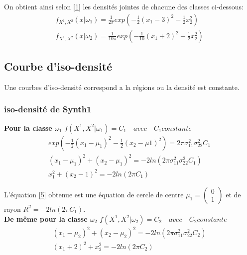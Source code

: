 \documentclass[10pt]{article}
\begin{document}
On obtient ainsi selon \eqref{1} les densités jointes de chacune des classes ci-dessous:
\begin{equation}
\begin{split}
f_{X^{1}, X^{2}}(x|\omega_{1}) = \frac{1}{2\pi} exp(-\frac{1}{2}(x_{1}-3)^2 - \frac{1}{2}x_{2}^2       )  \\
f_{X^{1}, X^{2}}(x|\omega_{2}) = \frac{1}{10\pi} exp(-\frac{1}{10}(x_{1}+2)^{2}  - \frac{1}{2}x_{2}^{2})
\end{split}
\label{6}
\end{equation}


\subsection{Courbe d'iso-densité}
Une courbes d'iso-densité correspond a la régions ou la densité est constante.

\subsubsection{iso-densité de Synth1}
\textbf{Pour la classe $\omega_{1}$} $f(X^{1}, X^{2}|\omega_{1}) = C_{1} \quad avec \quad C_{1} constante$
\begin{equation}
\begin{split}
exp(-\frac{1}{2} (x_{1}-\mu_{1})^{2} - \frac{1}{2}(x_{2} - \mu{1})^{2})  = 2 \pi \sigma_{11}^{2} \sigma_{22}^{2} C_{1}
\\
(x_{1} - \mu_{1})^{2} + (x_{2} - \mu_{1})^{2} = -2ln(2 \pi \sigma_{11}^{2} \sigma_{22}^{2} C_{1})
\\
x_{1}^{2} + (x_{2} - 1)^{2} = -2 ln(2\pi C_{1})
\end{split}
\label{7}
\end{equation}

 L'équation \eqref{5} obtenue est une équation de cercle de centre $\mu_{1} = \begin{pmatrix} 0 \\ 1\end{pmatrix} $ et de rayon $R^{2} = -2 ln(2\pi C_{1})$.\\
 
 \textbf{De même pour la classe $\omega_{2}$} $f(X^{1}, X^{2}|\omega_{2}) = C_{2} \quad avec \quad C_{2} constante$
 \begin{equation}
 \begin{split}
 (x_{1} - \mu_{2})^{2} + (x_{2} - \mu_{2})^{2} = -2ln(2 \pi \sigma_{11}^{2} \sigma_{22}^{2}C_{2}) 
 \\
 (x_{1} + 2)^{2} + x_{2}^{2} = -2ln(2\pi C_{2})
 \label{8}
\end{split}
 \end{equation}
 
\end{document}
